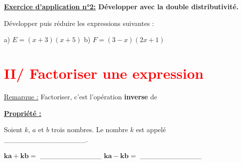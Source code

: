 \documentclass[12pt]{article}
\begin{document}
\vspace{10pt}
\begin{mdframed}[
    linewidth=1pt,
    roundcorner=5pt,
    linecolor=RoyalBlue,
    innertopmargin=10pt,
    innerbottommargin=10pt
]
{\color{RoyalBlue}
\textbf{\underline{Exercice d'application n°2:} Développer avec la double distributivité.}}

\vspace{5pt}
Développer puis réduire les expressions suivantes :

\vspace{5pt}
\hspace{1cm}a) $E = (x+3)(x+5)$ \hspace{2cm}b) $F = (3-x)(2x+1)$

\vspace{0.5cm}
{\color{black!45}\dotfill}

\vspace{0.5cm}
{\color{black!45}\dotfill}

\vspace{0.5cm}
{\color{black!45}\dotfill}

\vspace{0.5cm}
{\color{black!45}\dotfill}

\vspace{0.5cm}
{\color{black!45}\dotfill}

\vspace{20pt}

\end{mdframed}

\vspace{5pt}
\section*{\textcolor{red}{II/ Factoriser une expression}}

\vspace{5pt}
\underline{Remarque :} Factoriser, c'est l'opération \textbf{inverse} de {\color{black!45}\dotfill}

\vspace{10pt}
\begin{mdframed}[
    linewidth=1pt,
    roundcorner=5pt,
    linecolor=Red,
    innertopmargin=10pt,
    innerbottommargin=10pt
]
{\color{red}
\textbf{\underline{Propriété :}}

\vspace{5pt}
Soient $k$, $a$ et $b$ trois nombres. Le nombre $k$ est appelé \_\_\_\_\_\_\_\_\_\_\_\_\_\_\_\_.

\vspace{5pt}
\begin{center}
    $\bm{ka + kb = }$ \_\_\_\_\_\_\_\_\_\_\_\_ \hspace{2cm} $\bm{ka - kb = }$ \_\_\_\_\_\_\_\_\_\_\_\_
\end{center}
}
\end{mdframed}
\end{document}
